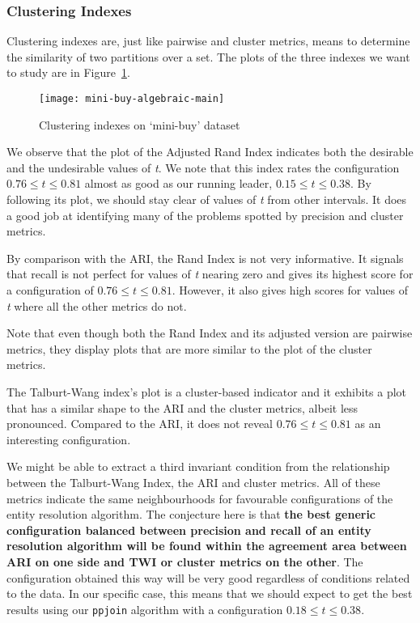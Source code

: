 \subsubsection{Clustering Indexes}\label{subsubsec:Clustering Indexes}

Clustering indexes are, just like pairwise and cluster metrics, means to
determine the similarity of two partitions over a set.
The plots of the three indexes we want to study are in Figure~\ref{fig:mini-alg}.

\begin{figure}[htbp]
    \centering
    \captionsetup{justification=centering}
    \texttt{[image: mini-buy-algebraic-main]}
    \caption{Clustering indexes on `mini-buy' dataset}\label{fig:mini-alg}
\end{figure}

We observe that the plot of the Adjusted Rand Index indicates both the desirable
and the undesirable values of \textit{t}.
We note that this index rates the configuration $0.76 \le t \le 0.81$ almost as
good as our running leader, $0.15 \le t \le 0.38$.
By following its plot, we should stay clear of values of \textit{t} from other
intervals.
It does a good job at identifying many of the problems spotted by precision and
cluster metrics.

By comparison with the ARI, the Rand Index is not very informative.
It signals that recall is not perfect for values of \textit{t} nearing zero and
gives its highest score for a configuration of $0.76 \le t \le 0.81$.
However, it also gives high scores for values of \textit{t} where all the other
metrics do not.

Note that even though both the Rand Index and its adjusted version are pairwise
metrics, they display plots that are more similar to the plot of the cluster
metrics.

The Talburt-Wang index's plot is a cluster-based indicator and it exhibits a
plot that has a similar shape to the ARI and the cluster metrics, albeit less
pronounced.
Compared to the ARI, it does not reveal $0.76 \le t \le 0.81$ as an interesting
configuration.

We might be able to extract a third invariant condition from the relationship
between the Talburt-Wang Index, the ARI and cluster metrics.
All of these metrics indicate the same neighbourhoods for favourable
configurations of the entity resolution algorithm.
The conjecture here is that \textbf{the best generic configuration balanced
    between precision and recall of an entity resolution algorithm will be found
    within the agreement area between ARI on one side and TWI or cluster metrics on
    the other}.
The configuration obtained this way will be very good regardless of conditions
related to the data.
In our specific case, this means that we should expect to get the best results
using our \texttt{ppjoin} algorithm with a configuration $0.18 \le t \le 0.38$.

